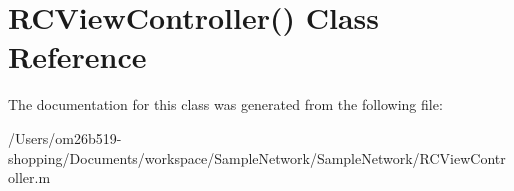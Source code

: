 \hypertarget{interface_r_c_view_controller_07_08}{\section{R\-C\-View\-Controller() Class Reference}
\label{interface_r_c_view_controller_07_08}
}


The documentation for this class was generated from the following file\-:\begin{DoxyCompactItemize}
\item 
/\-Users/om26b519-\/shopping/\-Documents/workspace/\-Sample\-Network/\-Sample\-Network/R\-C\-View\-Controller.\-m\end{DoxyCompactItemize}
